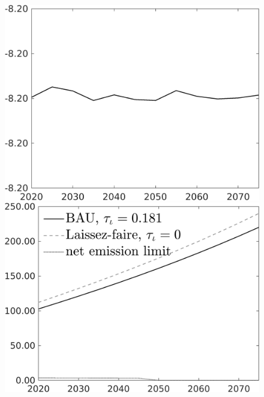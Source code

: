 \documentclass[12pt]{article}
\begin{document}
\begin{figure}[h!!]
\begin{minipage}[]{0.32\textwidth}
	\end{minipage}	
	\begin{minipage}[]{0.32\textwidth}
		\includegraphics[width=1\textwidth]{../../codding_model/own_basedOnFried/optimalPol_010922_revision/figures/all_13Sept22/CompTaul_Equlab_LFBAUPer_Reg0_C_spillover0_nsk1_xgr0_knspil1_sep1_countec0_GovRev0_etaa0.79.png}
	\end{minipage}	
	\begin{minipage}[]{0.32\textwidth}
		\includegraphics[width=1\textwidth]{../../codding_model/own_basedOnFried/optimalPol_010922_revision/figures/all_13Sept22/CompTaul_Equlab_LFBAU_Reg0_Emnet_spillover0_nsk1_xgr0_knspil1_sep1_countec0_GovRev0_etaa0.79_lgd1.png}

\end{minipage}
\end{figure}
\end{document}
